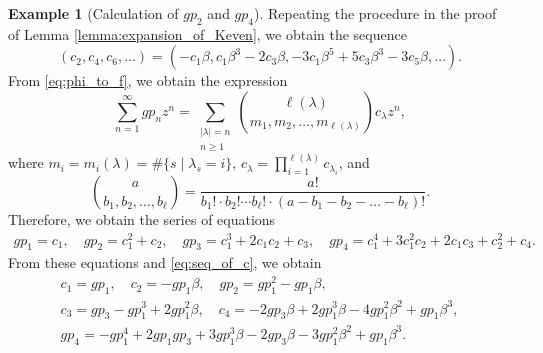 \documentclass[dvipdfmx]{amsart}
\theoremstyle{definition}
\newtheorem{exa}[thm]{Example}%
\theoremstyle{remark}
\begin{document}
\begin{exa}[Calculation of $gp_2$ and $gp_4$]
Repeating the procedure in the proof of Lemma \ref{lemma:expansion_of_Keven}, we obtain the sequence 
\begin{equation}\label{eq:seq_of_c}
(c_2,c_4,c_6,\dots)=(-c_1\beta,c_1\beta^3-2c_3\beta ,-3c_1\beta^5+5c_3\beta^3-3c_5\beta,\dots).
\end{equation}
From \eqref{eq:phi_to_f}, we obtain the expression
\[
\sum_{n=1}^\infty gp_nz^n=\sum_{\substack{|\lambda|=n\\n\geq 1}}
\binom{\ell(\lambda)}{m_1,m_2,\dots,m_{\ell(\lambda)}}c_\lambda z^n,
\]
where \( m_i = m_i(\lambda) = \#\{ s \mid \lambda_s = i \} \), $c_{\lambda}=\prod_{i=1}^{\ell(\lambda)}c_{\lambda_i}$, and 
\[
\binom{a}{b_1,b_2,\dots,b_\ell}=\frac{a!}{b_1!\cdot b_2!\cdots b_\ell!\cdot (a-b_1-b_2-\dots-b_\ell)!}.
\]
Therefore, we obtain the series of equations
\[
\begin{gathered}
gp_1=c_1,\quad gp_2=c_1^2+c_2,\quad gp_3=c_1^3+2c_1c_2+c_3,\quad
gp_4=c_1^4+3c_1^2c_2+2c_1c_3+c_2^2+c_4.
\end{gathered}
\]
From these equations and \eqref{eq:seq_of_c}, we obtain
\[
\begin{gathered}
c_1=gp_1,\quad 
c_2=-gp_1\beta,\quad 
gp_2=gp_1^2-gp_1\beta,\\
c_3=gp_3-gp_1^3+2gp_1^2\beta,\quad 
c_4=-2gp_3\beta+2gp_1^3\beta-4gp_1^2\beta^2+gp_1\beta^3,\\
gp_4=-gp_1^4+2gp_1gp_3+3gp_1^3\beta-2gp_3\beta-3gp_1^2\beta^2+gp_1\beta^3.
\end{gathered}
\]
\end{exa}




%
%
\end{document}
